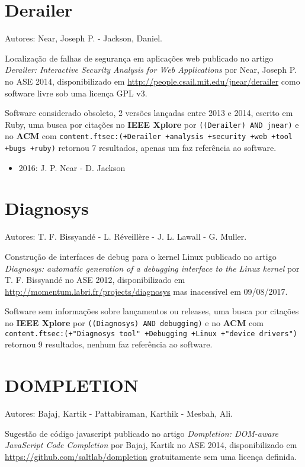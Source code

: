\section{Derailer}

Autores:
Near, Joseph P. - Jackson, Daniel.

Localização de falhas de segurança em aplicações web
publicado no artigo {\it Derailer: Interactive Security Analysis for Web Applications}
por Near, Joseph P.
no ASE 2014,
disponibilizado em \url{http://people.csail.mit.edu/jnear/derailer}
como software livre
sob uma licença GPL v3.

Software considerado obsoleto,
2 versões lançadas
entre 2013 e 2014,
escrito em Ruby,
uma busca por citações no {\bf IEEE Xplore} por
\texttt{((Derailer) AND jnear)}
e no {\bf ACM} com
\texttt{content.ftsec:(+Derailer +analysis +security +web +tool +bugs +ruby)}
retornou
7 resultados,
apenas um faz referência ao software.

\begin{itemize}
\item 2016: J. P. Near - D. Jackson
\end{itemize}

\section{Diagnosys}

Autores:
T. F. Bissyandé - L. Réveillère - J. L. Lawall - G. Muller.

Construção de interfaces de debug para o kernel Linux
publicado no artigo {\it Diagnosys: automatic generation of a debugging interface to the Linux kernel}
por T. F. Bissyandé
no ASE 2012,
disponibilizado em \url{http://momentum.labri.fr/projects/diagnosys}
mas inacessível em 09/08/2017.

Software sem informações sobre lançamentos ou releases,
uma busca por citações no {\bf IEEE Xplore} por
\texttt{((Diagnosys) AND debugging)}
e no {\bf ACM} com
\texttt{content.ftsec:(+"Diagnosys tool" +Debugging +Linux +"device drivers")}
retornou
9 resultados,
nenhum faz referência ao software.


\section{DOMPLETION}

Autores:
Bajaj, Kartik - Pattabiraman, Karthik - Mesbah, Ali.

Sugestão de código javascript
publicado no artigo {\it Dompletion: DOM-aware JavaScript Code Completion}
por Bajaj, Kartik
no ASE 2014,
disponibilizado em \url{https://github.com/saltlab/dompletion}
gratuitamente
sem uma licença definida.

